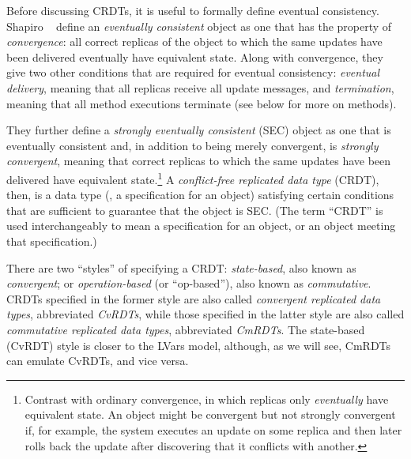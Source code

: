 \documentclass{article}
\begin{document}
Before discussing CRDTs, it is useful to formally define eventual
consistency.  Shapiro \etal~\cite{crdts} define an \emph{eventually
  consistent} object as one that has the property of
\emph{convergence}: all correct replicas of the object to which the
same updates have been delivered eventually have equivalent state.
Along with convergence, they give two other conditions that are
required for eventual consistency: \emph{eventual delivery}, meaning
that all replicas receive all update messages, and \emph{termination},
meaning that all method executions terminate (see below for more on
methods).

They further define a \emph{strongly eventually consistent} (SEC)
object as one that is eventually consistent and, in addition to being
merely convergent, is \emph{strongly convergent}, meaning that correct
replicas to which the same updates have been delivered have equivalent
state.\footnote{Contrast with ordinary convergence, in which replicas
  only \emph{eventually} have equivalent state.  An object might be
  convergent but not strongly convergent if, for example, the system
  executes an update on some replica and then later rolls back the
  update after discovering that it conflicts with another.}  A
\emph{conflict-free replicated data type} (CRDT), then, is a data type
(\ie, a specification for an object) satisfying certain conditions
that are sufficient to guarantee that the object is SEC.  (The term
``CRDT'' is used interchangeably to mean a specification for an
object, or an object meeting that specification.)

There are two ``styles'' of specifying a CRDT: \emph{state-based},
also known as \emph{convergent}; or \emph{operation-based} (or
``op-based''), also known as \emph{commutative}.  CRDTs specified in
the former style are also called \emph{convergent replicated data
  types}, abbreviated \emph{CvRDTs}, while those specified in the
latter style are also called \emph{commutative replicated data types},
abbreviated \emph{CmRDTs}.  The state-based (CvRDT) style is closer to
the LVars model, although, as we will see, CmRDTs can emulate CvRDTs,
and vice versa.

\end{document}
